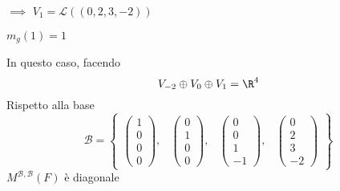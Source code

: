 {\begin{enumerate}
        $\implies$ $ V_1= \mathscr{L}((0, 2, 3, -2)) $

        $ m_{g}(1)=1  $
    \end{enumerate}

    In questo caso, facendo \[
        V_{-2}\oplus V_0\oplus V_1=\R^{4}
    \]
    Rispetto alla base \[
        \mathscr{B}=\begin{Bmatrix}
            \begin{pmatrix}
                1 \\ 0 \\ 0 \\ 0
            \end{pmatrix}, & \begin{pmatrix}
                0 \\ 1 \\ 0 \\ 0
            \end{pmatrix}, & \begin{pmatrix}
                0 \\ 0 \\ 1 \\ -1
            \end{pmatrix}, & \begin{pmatrix}
                0 \\ 2 \\ 3 \\  -2
            \end{pmatrix}
        \end{Bmatrix}
    \]
    $ M^{ \mathscr{B}, \mathscr{B}}(F) $ è diagonale
}



